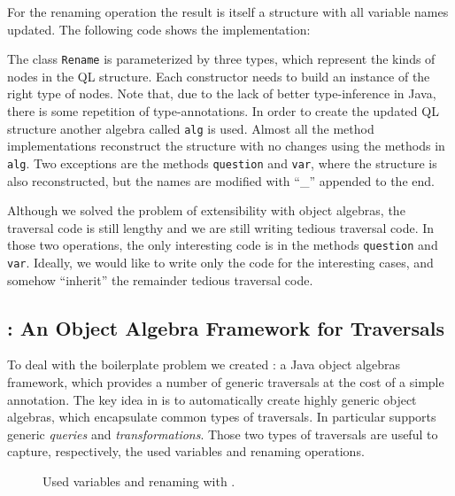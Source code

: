 For the renaming operation the result is itself a structure
with all variable names updated. The following code shows the
implementation:


The class \lstinline{Rename} is parameterized by three types,
which represent the kinds of nodes in the QL structure. Each
constructor needs to build an instance of the right type of nodes.
Note that, due to the lack of better type-inference in Java, there is
some repetition of type-annotations. In order to create the updated
QL structure another algebra called \lstinline{alg} is used.
Almost all the method implementations reconstruct the structure with
no changes using the methods in \lstinline{alg}. Two exceptions are the
methods \lstinline{question} and \lstinline{var}, where the structure is also reconstructed, but
the names are modified with ``\_'' appended to the end.

Although we solved the problem of extensibility with object
algebras, the traversal code is still lengthy and we are still writing
tedious traversal code. In those two operations, the only interesting code
is in the methods \lstinline{question} and \lstinline{var}. Ideally, we would like to write only
the code for the interesting cases, and somehow ``inherit'' the
remainder tedious traversal code.

\subsection{\Name: An Object Algebra Framework for Traversals}

To deal with the boilerplate problem we created \Name: a Java object
algebras framework, which provides a number of generic traversals at
the cost of a simple annotation. The key idea in \name is to
automatically create highly generic object algebras, which encapsulate
common types of traversals. In particular \name supports generic
\emph{queries} and \emph{transformations}. Those two types of
traversals are useful to capture, respectively, the used variables and
renaming operations.

\begin{figure}[t]
\nocaptionrule
\vspace{-.1in}
\caption{Used variables and renaming with \Name.}
\label{ql_with_oaframework}
\end{figure}

